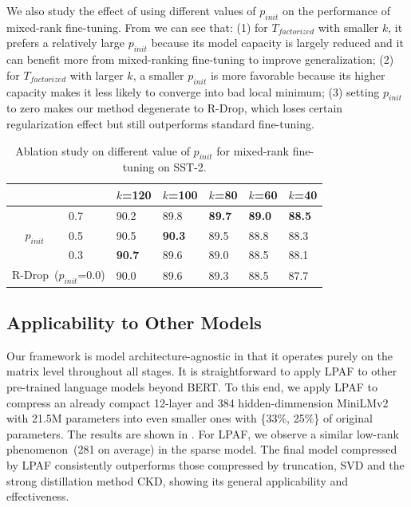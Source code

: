 We also study the effect of using different values of $p_{init}$ on the performance of mixed-rank fine-tuning. From  we can see that: (1) for $T_{factorized}$ with smaller $k$, it prefers a relatively large $p_{init}$ because its model capacity is largely reduced and it can benefit more from mixed-ranking fine-tuning to improve generalization; (2) for $T_{factorized}$ with larger $k$, a smaller $p_{init}$ is more favorable because its higher capacity makes it less likely to converge into bad local minimum; (3) setting $p_{init}$ to zero makes our method degenerate to R-Drop, which loses certain regularization effect but still outperforms standard fine-tuning.
\begin{table}[th]
	\centering
	\scriptsize
	\begin{tabular}{cl|lllll}
		\toprule
		&     & $k$=120 & $k$=100 & $k$=80 & $k$=60 & $k$=40   \\
		\midrule
		\multirow{3}{*}{$p_{init}$} & 0.7 & 90.2  & 89.8  & \textbf{89.7} & \textbf{89.0} & \textbf{88.5} \\
		& 0.5 & 90.5  & \textbf{90.3}  & 89.5 & 88.8 & 88.3 \\
		& 0.3 & \textbf{90.7}  & 89.6  & 89.0 & 88.5 & 88.1 \\
		\midrule
		\multicolumn{2}{c|}{R-Drop~($p_{init}$=0.0)}     & 90.0  & 89.6  & 89.3 & 88.5 & 87.7 \\
		\bottomrule
	\end{tabular}
	\caption{Ablation study on different value of $p_{init}$ for mixed-rank fine-tuning on SST-2.
}
	\label{table:diffp}
\end{table}


\subsection{Applicability to Other Models}
Our framework is model architecture-agnostic in that it operates purely on the 
matrix level throughout all stages. It is straightforward to apply LPAF to other pre-trained language models beyond BERT. To this end, we apply  LPAF to compress an already compact 12-layer and 384 hidden-dimmension MiniLMv2~\cite{minilm} with 21.5M parameters into even smaller ones with \{33\%, 25\%\} of original parameters. The results are shown in . For LPAF, we observe a similar low-rank phenomenon~(281 on average) in the sparse model. The final model compressed by LPAF consistently outperforms those compressed by truncation, SVD and the strong distillation method CKD, showing its general applicability and effectiveness.


